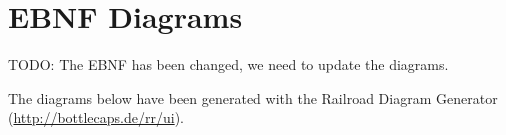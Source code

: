 \section*{EBNF Diagrams}
\label{app:ebnf}
TODO: The EBNF has been changed, we need to update the diagrams.
%

The diagrams below have been generated with the Railroad Diagram Generator (\url{http://bottlecaps.de/rr/ui}).

